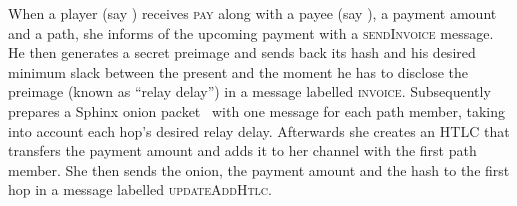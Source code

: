   When a player (say \alice) receives \textsc{pay} along with a payee (say
  \bob), a payment amount and a path, she informs \bob{} of the upcoming payment
  with a \textsc{sendInvoice} message. He then generates a secret preimage and
  sends back its hash and his desired minimum slack between the present and the
  moment he has to disclose the preimage (known as ``relay delay'') in a message
  labelled \textsc{invoice}. Subsequently \alice{} prepares a Sphinx onion
  packet~\cite{sphinx} with one message for each path member, taking into
  account each hop's desired relay delay. Afterwards she creates an HTLC that
  transfers the payment amount and adds it to her channel with the first path
  member. She then sends the onion, the payment amount and the hash to the first
  hop in a message labelled \textsc{updateAddHtlc}.

